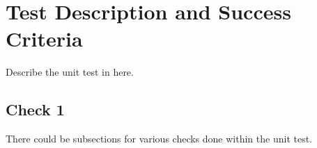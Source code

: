 

\section{Test Description and Success Criteria}
Describe the unit test in here.

\subsection{Check 1}
There could be subsections for various checks done within the unit test.
